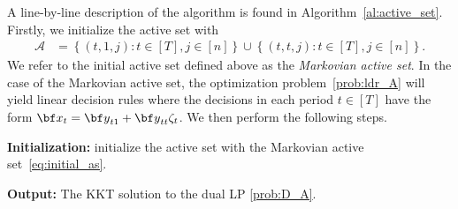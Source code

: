 \documentclass[nonblindrev,mnsc]{informs3} %
\newcommand{\bx}{{\bf x}}
\newcommand{\by}{{\bf y}}
\begin{document}
A line-by-line description of the algorithm is found in Algorithm~\ref{al:active_set}. 
Firstly, we initialize the active set with 
\begin{align}\label{eq:initial_as}
\mathcal{A} &= \left \{ (t,1,j): t \in [T], j \in [n] \right \} \cup  \left \{ (t,t,j): t \in [T], j \in [n] \right \}. 
\end{align} 
We refer to the initial active set defined above as the \emph{Markovian active set}. In the case of the Markovian active set,   the optimization problem~\eqref{prob:ldr_A} will yield linear decision rules where the decisions in each period $t \in [T]$ have the form 
$\bx_{t} = \by_{t1}  + \by_{tt} \zeta_t$. We then perform the following steps.

\begin{algorithm}
    \textbf{Initialization:} initialize the active set with the Markovian active set~\eqref{eq:initial_as}.
    
    \textbf{Output:} The KKT solution to the dual LP \eqref{prob:D_A}.
    \caption{An active set method for solving \eqref{prob:ldr}}
    \label{al:active_set}
\end{algorithm}
\end{document}
